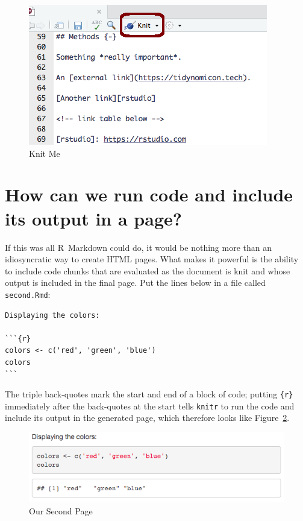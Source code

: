 \begin{figure}[h]
  \includegraphics{figures/rmarkdown/knit-button}
  \caption{Knit Me}
  \label{fig:knit-button}
\end{figure}

\section{How can we run code and include its output in a page?}

If this was all R~Markdown could do,
it would be nothing more than an idiosyncratic way to create HTML pages.
What makes it powerful is the ability to include code chunks
that are evaluated as the document is knit
and whose output is included in the final page.
Put the lines below in a file called \texttt{second.Rmd}:

\begin{lstlisting}
Displaying the colors:

```{r}
colors <- c('red', 'green', 'blue')
colors
```
\end{lstlisting}

The triple back-quotes mark the start and end of a block of code;
putting \texttt{\{r\}} immediately after the back-quotes at the start
tells \texttt{knitr} to run the code
and include its output in the generated page,
which therefore looks like Figure~\ref{fig:second-page}.

\begin{figure}[h]
  \includegraphics{figures/rmarkdown/second-page.png}
  \caption{Our Second Page}
  \label{fig:second-page}
\end{figure}

